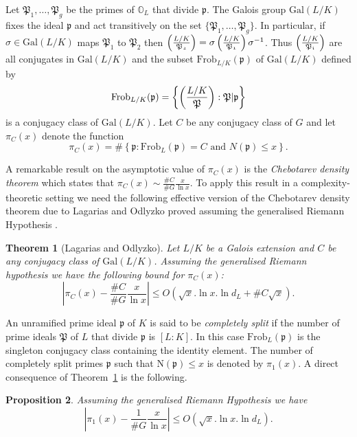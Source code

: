 \documentclass[11pt]{madras}%
\newtheorem{theorem}{Theorem}[chapter]
\newtheorem{proposition}[theorem]{Proposition}
\theoremstyle{remark}
\newcommand{\Norm}[1]{{\ensuremath{\mathrm{N}\left(#1\right)}}}
\newcommand{\Gal}[1]{{\ensuremath{\mathrm{Gal}\left(#1\right)}}}
\newcommand{\Ideal}[1]{{\ensuremath{\mathfrak{#1}}}}
\newcommand{\Frob}[2]{\ensuremath{\left(#1 \over #2\right)}}
\newcommand{\Artin}[2]{\ensuremath{\mathrm{Frob}_{#1}({#2})}}
\newcommand{\Int}[1][]{{\ensuremath{\mathbb{O}_{#1}}}}
\begin{document}
Let $\Ideal{P}_1, \ldots, \Ideal{P}_g$ be the primes of $\Int[L]$ that
divide $\Ideal{p}$. The Galois group $\Gal{L/K}$ fixes the ideal
$\Ideal{p}$ and act transitively on the set $\{ \Ideal{P}_1, \ldots,
\Ideal{P}_g \}$.  In particular, if $\sigma\in\Gal{L/K}$ maps
$\Ideal{P_1}$ to $\Ideal{P_2}$ then $\Frob{L/K}{\Ideal{P_2}} = \sigma
\Frob{L/K}{\Ideal{P_1}} \sigma^{-1}$.  Thus $\Frob{L/K}{\Ideal{P_i}}$
are all conjugates in $\Gal{L/K}$ and the subset
$\Artin{L/K}{\Ideal{p}}$ of $\Gal{L/K}$ defined by
\[
\Artin{L/K}{\Ideal{p}} = \left\{ \Frob{L/K}{\Ideal{P}} : \Ideal{P} |
  \Ideal{p}\right\}
\] 
is a conjugacy class of $\Gal{L/K}$. Let $C$ be any conjugacy class of
$G$ and let $\pi_C(x)$ denote the function
\[
\pi_C(x) = \# \left\{ \Ideal{p} : \Artin{L}{\Ideal{p}} = C
    \textrm{ and } N(\Ideal{p}) \leq x\right\} . 
\]

A remarkable result on the asymptotic value of $\pi_C(x)$ is the
\emph{Chebotarev density theorem} which states that $\pi_C(x) \sim
\frac{\# C}{\# G} \frac{x}{\ln x}$. To apply this result in a
complexity-theoretic setting we need the following effective version
of the Chebotarev density theorem due to Lagarias and Odlyzko proved
assuming the generalised Riemann Hypothesis
\cite{lagarias:1977:effective}.

\begin{theorem}[Lagarias and Odlyzko]\label{thm-effective-cheb}
Let $L/K$ be a Galois extension and $C$ be any conjugacy class of
$\Gal{L/K}$. Assuming the generalised Riemann hypothesis we have the following bound for
$\pi_C(x)$:
\[
\left| \pi_C(x) - \frac{\# C}{\# G} \frac{x}{\ln x} \right| \leq
O\left(\sqrt{x} .\ln{x}.\ln {d_L} + \# C \sqrt{x}\right).
\]
\end{theorem}

An unramified prime ideal $\Ideal{p}$ of $K$ is said to be
\emph{completely split} if the number of prime ideals $\Ideal{P}$ of
$L$ that divide $\Ideal{p}$ is $[L:K]$. In this case
$\Artin{L}{\Ideal{p}}$ is the singleton conjugacy class containing the
identity element. The number of completely split primes $\Ideal{p}$
such that $\Norm{\Ideal{p}} \leq x$ is denoted by $\pi_1(x)$. A direct
consequence of Theorem~\ref{thm-effective-cheb} is the following.

\begin{proposition}\label{prop-splitprime}
  Assuming the generalised Riemann Hypothesis we have
  \[
  \left| \pi_1(x) - \frac{1}{\# G} \frac{x}{\ln x} \right | \leq
  O\left(\sqrt{x}.\ln{x}.\ln {d_L}\right).
  \]
\end{proposition}
\end{document}
